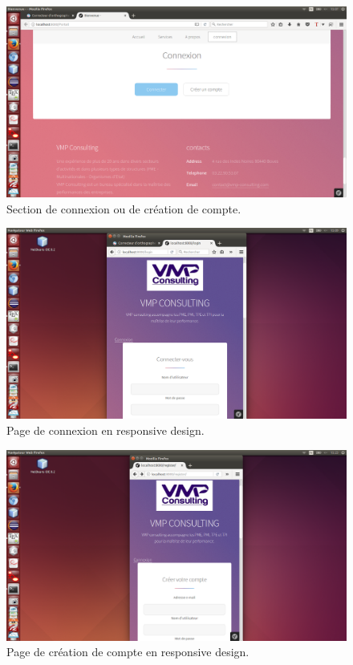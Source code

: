 \documentclass[12pt]{article}
\begin{document}
\begin{figure}[htp]
  \centering
  \includegraphics[width=12cm]{t2.png}
  \caption{Section de connexion ou de création de compte.}
  \label{fig:une-autre-image}
\end{figure}

\begin{figure}[htp]
  \centering
  \includegraphics[width=12cm]{t4.png}
  \caption{Page de connexion en responsive design.}
  \label{fig:une-autre-image}
\end{figure}

\begin{figure}[htp]
  \centering
  \includegraphics[width=12cm]{t5.png}
  \caption{Page de création de compte en responsive design.}
  \label{fig:une-autre-image}
\end{figure}
\end{document}
